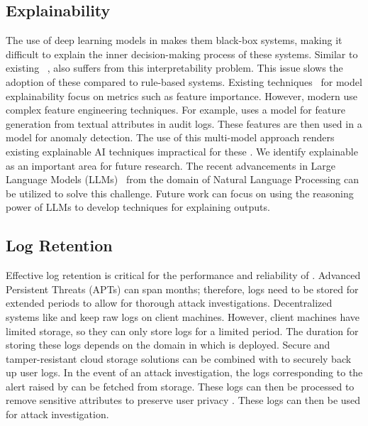 \subsection{Explainability} The use of deep learning models in \pids makes them black-box systems, making it difficult to explain the inner decision-making process of these systems. Similar to existing \pids~\cite{flash2024,cheng2023kairos,yangprographer}, \Sys also suffers from this interpretability problem. This issue slows the adoption of these \pids compared to rule-based systems. Existing techniques~\cite{antwarg2021explaining,brown2018recurrent,ardito2021revisiting,hwang2021sfd} for model explainability focus on metrics such as feature importance. However, modern \pids use complex feature engineering techniques. For example, \flash uses a \wordvec model for feature generation from textual attributes in audit logs. These features are then used in a \gnn model for anomaly detection. The use of this multi-model approach renders existing explainable AI techniques impractical for these \pids. We identify explainable \pids as an important area for future research. The recent advancements in Large Language Models (LLMs)~\cite{chang2024survey} from the domain of Natural Language Processing can be utilized to solve this challenge. Future work can focus on using the reasoning power of LLMs to develop techniques for explaining \pids outputs.

\subsection{Log Retention} Effective log retention \cite{wilbert2012log} is critical for the performance and reliability of \pids. Advanced Persistent Threats (APTs) can span months; therefore, logs need to be stored for extended periods to allow for thorough attack investigations. Decentralized systems like \Sys and \disdet \cite{dong2023distdet} keep raw logs on client machines. However, client machines have limited storage, so they can only store logs for a limited period. The duration for storing these logs depends on the domain in which \Sys is deployed. Secure and tamper-resistant cloud storage solutions \cite{kumar2018secure} can be combined with \Sys to securely back up user logs. In the event of an attack investigation, the logs corresponding to the alert raised by \Sys can be fetched from storage. These logs can then be processed to remove sensitive attributes to preserve user privacy \cite{portillo2019towards}. These logs can then be used for attack investigation.

